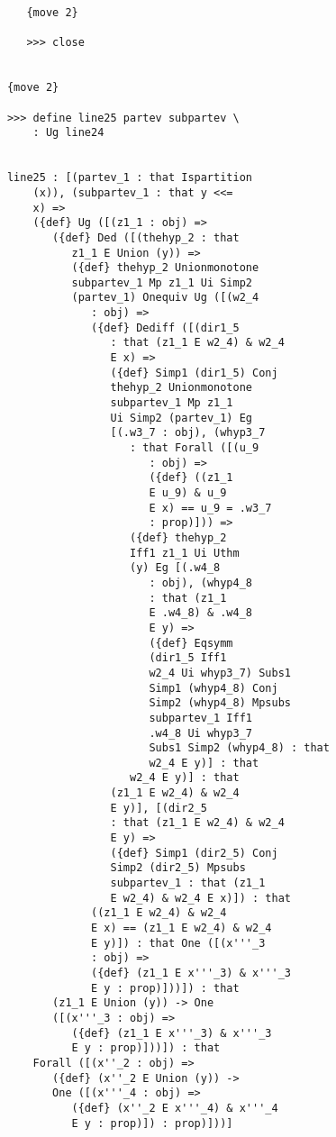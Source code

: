 \documentclass[12pt]{article}
\begin{document}
\begin{verbatim}
         {move 2}

         >>> close


      {move 2}

      >>> define line25 partev subpartev \
          : Ug line24


      line25 : [(partev_1 : that Ispartition 
          (x)), (subpartev_1 : that y <<= 
          x) => 
          ({def} Ug ([(z1_1 : obj) => 
             ({def} Ded ([(thehyp_2 : that 
                z1_1 E Union (y)) => 
                ({def} thehyp_2 Unionmonotone 
                subpartev_1 Mp z1_1 Ui Simp2 
                (partev_1) Onequiv Ug ([(w2_4 
                   : obj) => 
                   ({def} Dediff ([(dir1_5 
                      : that (z1_1 E w2_4) & w2_4 
                      E x) => 
                      ({def} Simp1 (dir1_5) Conj 
                      thehyp_2 Unionmonotone 
                      subpartev_1 Mp z1_1 
                      Ui Simp2 (partev_1) Eg 
                      [(.w3_7 : obj), (whyp3_7 
                         : that Forall ([(u_9 
                            : obj) => 
                            ({def} ((z1_1 
                            E u_9) & u_9 
                            E x) == u_9 = .w3_7 
                            : prop)])) => 
                         ({def} thehyp_2 
                         Iff1 z1_1 Ui Uthm 
                         (y) Eg [(.w4_8 
                            : obj), (whyp4_8 
                            : that (z1_1 
                            E .w4_8) & .w4_8 
                            E y) => 
                            ({def} Eqsymm 
                            (dir1_5 Iff1 
                            w2_4 Ui whyp3_7) Subs1 
                            Simp1 (whyp4_8) Conj 
                            Simp2 (whyp4_8) Mpsubs 
                            subpartev_1 Iff1 
                            .w4_8 Ui whyp3_7 
                            Subs1 Simp2 (whyp4_8) : that 
                            w2_4 E y)] : that 
                         w2_4 E y)] : that 
                      (z1_1 E w2_4) & w2_4 
                      E y)], [(dir2_5 
                      : that (z1_1 E w2_4) & w2_4 
                      E y) => 
                      ({def} Simp1 (dir2_5) Conj 
                      Simp2 (dir2_5) Mpsubs 
                      subpartev_1 : that (z1_1 
                      E w2_4) & w2_4 E x)]) : that 
                   ((z1_1 E w2_4) & w2_4 
                   E x) == (z1_1 E w2_4) & w2_4 
                   E y)]) : that One ([(x'''_3 
                   : obj) => 
                   ({def} (z1_1 E x'''_3) & x'''_3 
                   E y : prop)]))]) : that 
             (z1_1 E Union (y)) -> One 
             ([(x'''_3 : obj) => 
                ({def} (z1_1 E x'''_3) & x'''_3 
                E y : prop)]))]) : that 
          Forall ([(x''_2 : obj) => 
             ({def} (x''_2 E Union (y)) -> 
             One ([(x'''_4 : obj) => 
                ({def} (x''_2 E x'''_4) & x'''_4 
                E y : prop)]) : prop)]))]



\end{verbatim}
\end{document}
